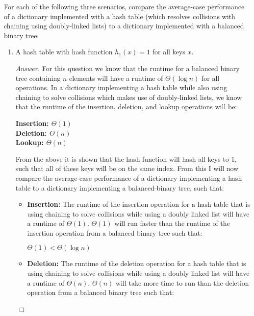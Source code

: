 \documentclass[11pt]{article}
\theoremstyle{definition}
\theoremstyle{definition}
\theoremstyle{definition}
\begin{document}
    \noindent For each of the following three scenarios, compare the average-case performance of a dictionary implemented with a hash table (which resolves collisions with chaining using doubly-linked lists) to a dictionary implemented with a balanced binary tree.
        
    \begin{enumerate}[label=(\alph*)]
    \item A hash table with hash function $h_1(x)=1$ for all keys $x$.
    
    \begin{proof}[Answer]
        For this question we know that the runtime for a balanced binary tree containing $n$ elements will have a runtime of $\Theta(\log n)$ for all operations. In a dictionary implementing a hash table while also using chaining to solve collisions which makes use of doubly-linked lists, we know that the runtime of the insertion, deletion, and lookup operations will be: \\
\begin{center}
\textbf{Insertion: $\Theta(1)$} \\
\textbf{Deletion: $\Theta(n)$} \\
\textbf{Lookup: $\Theta(n)$}
\end{center}
From the above it is shown that the hash function will hash all keys to 1, such that all of these keys will be on the same index.
From this I will now compare the average-case performance of a dictionary implementing a hash table to a dictionary implementing a balanced-binary tree, such that: \\
\begin{itemize}
\item \textbf{Insertion:} The runtime of the insertion operation for a hash table that is using chaining to solve collisions while using a doubly linked list will have a runtime of $\Theta(1)$. $\Theta(1)$ will run faster than the runtime of the insertion operation from a balanced binary tree such that: \\
\begin{center}
$\Theta(1) < \Theta(\log n)$
\end{center}
\item \textbf{Deletion:} The runtime of the deletion operation for a hash table that is using chaining to solve collisions while using a doubly linked list will have a runtime of $\Theta(n)$. $\Theta(n)$ will take more time to run than the deletion operation from a balanced binary tree such that: \\

\end{itemize}
\end{proof}
\end{enumerate}
\end{document}
